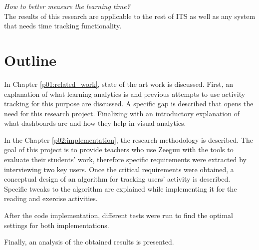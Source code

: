 \emph{How to better measure the learning time?}\\

The results of this research are applicable to the rest of ITS as well as any system that needs time tracking functionality.

\section{Outline}

In Chapter \ref{p01:related_work}, state of the art work is discussed. First, an explanation of what learning analytics is and previous attempts to use activity tracking for this purpose are discussed. A specific gap is described that opens the need for this research project. Finalizing with an introductory explanation of what dashboards are and how they help in visual analytics.

In the Chapter \ref{p02:implementation}, the research methodology is described. The goal of this project is to provide teachers who use Zeeguu with the tools to evaluate their students' work, therefore specific requirements were extracted by interviewing two key users. Once the critical requirements were obtained, a conceptual design of an algorithm for tracking users' activity is described. Specific tweaks to the algorithm are explained while implementing it for the reading and exercise activities.

After the code implementation, different tests were run to find the optimal settings for both implementations.

Finally, an analysis of the obtained results is presented.


